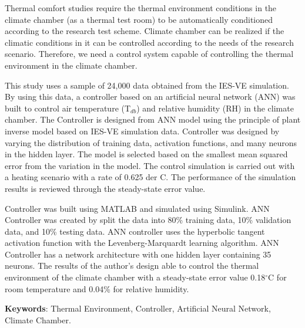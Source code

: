 Thermal comfort studies require the thermal environment conditions in the climate chamber (as a thermal test room) to be automatically conditioned according to the research test scheme. Climate chamber can be realized if the climatic conditions in it can be controlled according to the needs of the research scenario. Therefore, we need a control system capable of controlling the thermal environment in the climate chamber.

This study uses a sample of 24,000 data obtained from the IES-VE simulation. By using this data, a controller based on an artificial neural network (ANN) was built to control air temperature (T$_{db}$) and relative humidity (RH) in the climate chamber. The Controller is designed from ANN model using the principle of plant inverse model based on IES-VE simulation data. Controller was designed by varying the distribution of training data, activation functions, and many neurons in the hidden layer. The model is selected based on the smallest mean squared error from the variation in the model. The control simulation is carried out with a heating scenario with a rate of 0.625 der C. The performance of the simulation results is reviewed through the steady-state error value.


Controller was built using MATLAB and simulated using Simulink. ANN Controller was created by split the data into 80\% training data, 10\% validation data, and 10\% testing data. ANN controller uses the hyperbolic tangent activation function with the Levenberg-Marquardt learning algorithm. ANN Controller has a network architecture with one hidden layer containing 35 neurons. The results of the author's design able to control the thermal environment of the climate chamber with a steady-state error value 0.18$^\circ$C for room temperature and 0.04\% for relative humidity.

\vspace{0.5cm}
\hspace{-1.2cm}
\textbf{Keywords}: Thermal Environment, Controller, Artificial Neural Network, Climate Chamber.

